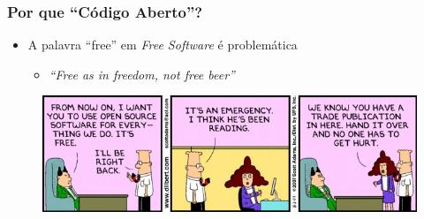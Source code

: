 \documentclass[xcolor=dvipsnames]{beamer}
\begin{document}
\begin{frame}
	\frametitle{Por que ``Código Aberto''? }
    \begin{itemize}
    \item A palavra ``free'' em \textit{Free Software} é problemática
      \begin{itemize}
        \item \textit{``Free as in freedom, not free beer''}
       \end{itemize} 
    \end{itemize}
	\begin{figure}
	\includegraphics[scale=0.40]{dilbert.jpg}\\

\end{figure}
\end{frame}
\end{document}
